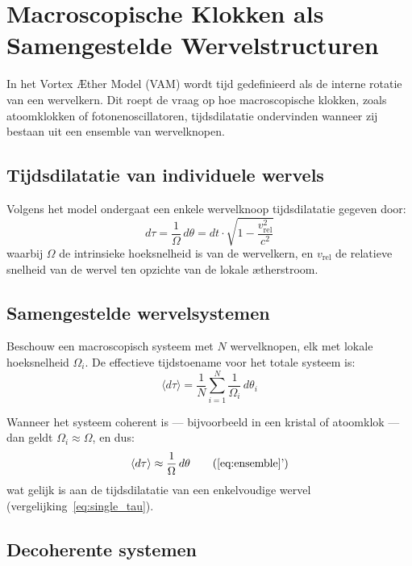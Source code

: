 \section{Macroscopische Klokken als Samengestelde Wervelstructuren}

In het Vortex Æther Model (VAM) wordt tijd gedefinieerd als de interne rotatie van een wervelkern. Dit roept de vraag op hoe macroscopische klokken, zoals atoomklokken of fotonenoscillatoren, tijdsdilatatie ondervinden wanneer zij bestaan uit een ensemble van wervelknopen.

\subsection*{Tijdsdilatatie van individuele wervels}

Volgens het model ondergaat een enkele wervelknoop tijdsdilatatie gegeven door:
\begin{equation}
    d\tau = \frac{1}{\Omega} \, d\theta = dt \cdot \sqrt{1 - \frac{v_{\text{rel}}^2}{c^2}} \label{eq:single_tau}
\end{equation}
waarbij \( \Omega \) de intrinsieke hoeksnelheid is van de wervelkern, en \( v_{\text{rel}} \) de relatieve snelheid van de wervel ten opzichte van de lokale ætherstroom.

\subsection*{Samengestelde wervelsystemen}

Beschouw een macroscopisch systeem met \( N \) wervelknopen, elk met lokale hoeksnelheid \( \Omega_i \). De effectieve tijdstoename voor het totale systeem is:
\begin{equation}
    \langle d\tau \rangle = \frac{1}{N} \sum_{i=1}^{N} \frac{1}{\Omega_i} \, d\theta_i \label{eq:ensemble}
\end{equation}

Wanneer het systeem coherent is — bijvoorbeeld in een kristal of atoomklok — dan geldt \( \Omega_i \approx \Omega \), en dus:
\begin{equation}
    \langle d\tau \rangle \approx \frac{1}{\Omega} \, d\theta \tag{\ref{eq:ensemble}'}
\end{equation}
wat gelijk is aan de tijdsdilatatie van een enkelvoudige wervel (vergelijking~\ref{eq:single_tau}).

\subsection*{Decoherente systemen}

